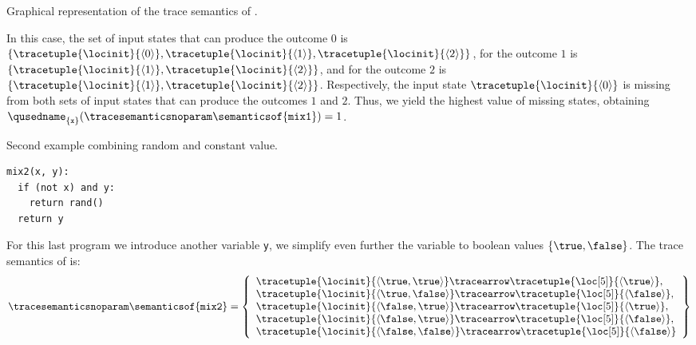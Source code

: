 \begin{example}
\begin{marginfigure}[*-2]
  \caption{Graphical representation of the trace semantics of .}
  \end{marginfigure}
  In this case, the set of input states that can produce the outcome $0$ is $\{\tracetuple{\locinit}{\langle 0\rangle}, \tracetuple{\locinit}{\langle 1\rangle}, \tracetuple{\locinit}{\langle 2\rangle}\}$, for the outcome $1$ is $\{\tracetuple{\locinit}{\langle 1\rangle}, \tracetuple{\locinit}{\langle 2\rangle}\}$, and for the outcome $2$ is $\{\tracetuple{\locinit}{\langle 1\rangle}, \tracetuple{\locinit}{\langle 2\rangle}\}$.
  Respectively, the input state $\tracetuple{\locinit}{\langle 0 \rangle}$ is missing from both sets of input states that can produce the outcomes $1$ and $2$.
  Thus, we yield the highest value of missing states, obtaining $\qusedname_{\{\texttt{x}\}}(\tracesemanticsnoparam\semanticsof{\texttt{mix1}})=1$.


  \begin{marginlisting}
    \caption{Second example combining random and constant value.}
    \vspace{25pt}
  \begin{lstlisting}[style=mystyle,language=customPython]
mix2(x, y):
  if (not x) and y:
    return rand()
  return y
 \end{lstlisting}
  \end{marginlisting}
  For this last program we introduce another variable \texttt{y}, we simplify even further the variable to boolean values $\{\true, \false\}$.
  The trace semantics of  is:
  \begin{align*}
    \tracesemanticsnoparam\semanticsof{\texttt{mix2}}
    =
    \left\{
      \begin{array}{l}
        \tracetuple{\locinit}{\langle \true, \true\rangle}\tracearrow\tracetuple{\loc[5]}{\langle \true\rangle}, \\
        \tracetuple{\locinit}{\langle \true, \false\rangle}\tracearrow\tracetuple{\loc[5]}{\langle \false\rangle}, \\
        \tracetuple{\locinit}{\langle \false, \true\rangle}\tracearrow\tracetuple{\loc[5]}{\langle \true\rangle}, \\
        \tracetuple{\locinit}{\langle \false, \true\rangle}\tracearrow\tracetuple{\loc[5]}{\langle \false\rangle}, \\
        \tracetuple{\locinit}{\langle \false, \false\rangle}\tracearrow\tracetuple{\loc[5]}{\langle \false\rangle}
      \end{array}
      \right\}
  \end{align*}
  \begin{marginfigure}
\end{marginfigure}
\end{example}
